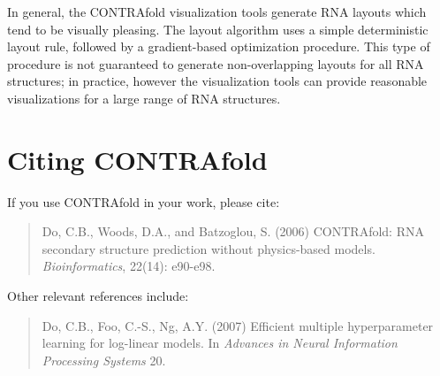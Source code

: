 \documentclass{article}
\begin{document}
  In general, the CONTRAfold visualization tools generate RNA layouts which 
  tend to be visually pleasing.  The layout algorithm uses a simple
  deterministic layout rule, followed by a gradient-based optimization
  procedure.  This type of procedure is not guaranteed to generate 
  non-overlapping layouts for all RNA structures; in practice, however
  the visualization tools can provide reasonable visualizations for
  a large range of RNA structures.
  
  \newpage
  \section{Citing CONTRAfold}

  If you use CONTRAfold in your work, please cite:
  \begin{quote}
    Do, C.B., Woods, D.A., and Batzoglou, S.  (2006) CONTRAfold: RNA 
    secondary structure prediction without physics-based models.
    \emph{Bioinformatics}, 22(14): e90-e98.
  \end{quote}
  
  \noindent
  Other relevant references include:
  \begin{quote}
    Do, C.B., Foo, C.-S., Ng, A.Y.  (2007) Efficient multiple
    hyperparameter learning for log-linear models.  In \emph{Advances
      in Neural Information Processing Systems} 20.
  \end{quote}
\end{document}
